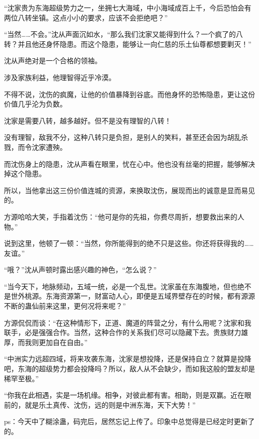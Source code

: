 \begin{this_body}
“沈家贵为东海超级势力之一，坐拥七大海域，中小海域成百上千，今后恐怕会有两位八转坐镇。这点小小的要求，应该不会拒绝吧？”

“当然……不会。”沈从声面沉如水，“那么我们沈家又能得到什么？一个疯了的八转？并且他还身怀隐患。而这个隐患，能够让一向仁慈的乐土仙尊都想要剿灭！”

沈从声绝对是一个合格的领袖。

涉及家族利益，他理智得近乎冷漠。

不得不说，沈伤的疯魔，让他的价值暴降到谷底。而他身怀的恐怖隐患，更让这份价值几乎沦为负数。

沈家是需要八转，越多越好。但不是没有理智的八转！

没有理智，敌我不分，这种八转只是负担，是别人的笑料，甚至还会因为胡乱杀戮，而令沈家遭殃。

而沈伤身上的隐患，沈从声看在眼里，忧在心中。他也没有丝毫的把握，能够解决掉这个隐患。

所以，当他拿出这三份价值连城的资源，来换取沈伤，展现而出的诚意是显而易见的。

方源哈哈大笑，手指着沈伤：“他可是你的先祖，你费尽周折，想要救出来的人物。”

说到这里，他顿了一顿：“当然，你所能得到的绝不只是这些。你还将获得我的……友谊。”

“哦？”沈从声顿时露出感兴趣的神色，“怎么说？”

“当今天下，地脉频动，五域一统，必是一个乱世。沈家虽在东海腹地，但也绝不是世外桃源。东海资源第一，财富动人心，即便是五域界壁存在的时候，都有源源不断的蛊仙前来这里，更何况将来呢？”

方源侃侃而谈：“在这种情形下，正道、魔道的阵营之分，有什么用呢？沈家和我联手，必是强强合作。当然，这种合作的关系我们尽可以隐藏下去。贵族财力雄厚，而我则更加自在自由。”

“中洲实力远超四域，将来攻袭东海，沈家是想投降，还是保持自立？就算是投降吧，东海的超级势力都会投降吗？所以，敌人从不会缺少，而如我这般的盟友却是稀罕至极。”

“你我在此相遇，实是一场机缘。相争，对彼此都有害。相助，则是双赢。近在眼前的，就是乐土真传、沈伤，远的则是中洲东海，天下大势！”

ps：今天中了糊涂蛊，码完后，居然忘记上传了。印象中总觉得是已经定时更新了的。

\end{this_body}

